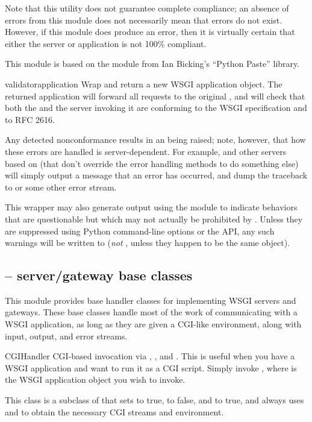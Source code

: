 Note that this utility does not guarantee complete  compliance;
an absence of errors from this module does not necessarily mean that
errors do not exist.  However, if this module does produce an error,
then it is virtually certain that either the server or application is
not 100\% compliant.

This module is based on the  module from Ian
Bicking's ``Python Paste'' library.

\begin{funcdesc}{validator}{application}
Wrap  and return a new WSGI application object.  The
returned application will forward all requests to the original
, and will check that both the  and
the server invoking it are conforming to the WSGI specification and to
RFC 2616.

Any detected nonconformance results in an 
being raised; note, however, that how these errors are handled is
server-dependent.  For example,  and other
servers based on  (that don't override the
error handling methods to do something else) will simply output a
message that an error has occurred, and dump the traceback to
 or some other error stream.

This wrapper may also generate output using the  module
to indicate behaviors that are questionable but which may not actually
be prohibited by .  Unless they are suppressed using Python
command-line options or the  API, any such warnings
will be written to  (\emph{not} ,
unless they happen to be the same object).
\end{funcdesc}

\subsection{ -- server/gateway base classes}

This module provides base handler classes for implementing WSGI servers
and gateways.  These base classes handle most of the work of
communicating with a WSGI application, as long as they are given a
CGI-like environment, along with input, output, and error streams.


\begin{classdesc}{CGIHandler}{}
CGI-based invocation via , ,
 and .  This is useful when you have
a WSGI application and want to run it as a CGI script.  Simply invoke
, where  is the WSGI application
object you wish to invoke.

This class is a subclass of  that sets
 to true,  to false, and
 to true, and always uses  and
 to obtain the necessary CGI streams and environment.
\end{classdesc}


